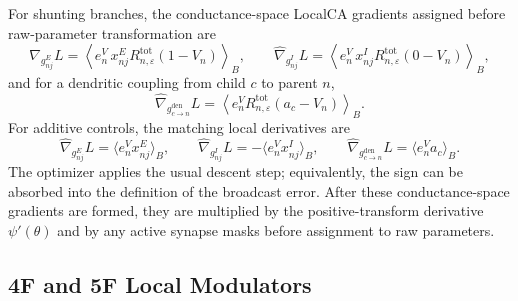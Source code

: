     For shunting branches, the conductance-space LocalCA gradients assigned before raw-parameter transformation are
    \[
    \widehat{\nabla}_{g_{nj}^{E}} L
    =\left\langle e_n^V\, x_{nj}^{E} R_{n,\varepsilon}^{\mathrm{tot}}(1-V_n)\right\rangle_B,
    \qquad
    \widehat{\nabla}_{g_{nj}^{I}} L
    =\left\langle e_n^V\, x_{nj}^{I} R_{n,\varepsilon}^{\mathrm{tot}}(0-V_n)\right\rangle_B,
    \]
    and for a dendritic coupling from child $c$ to parent $n$,
    \[
    \widehat{\nabla}_{g_{c\to n}^{\mathrm{den}}} L
    =\left\langle e_n^V R_{n,\varepsilon}^{\mathrm{tot}}(a_c-V_n)\right\rangle_B.
    \]
    For additive controls, the matching local derivatives are
    \[
    \widehat{\nabla}_{g_{nj}^{E}} L
    =\langle e_n^V x_{nj}^{E}\rangle_B,
    \qquad
    \widehat{\nabla}_{g_{nj}^{I}} L
    =-\langle e_n^V x_{nj}^{I}\rangle_B,
    \qquad
    \widehat{\nabla}_{g_{c\to n}^{\mathrm{den}}} L
    =\langle e_n^V a_c\rangle_B.
    \]
    The optimizer applies the usual descent step; equivalently, the sign can be absorbed into the definition of the broadcast error. After these conductance-space gradients are formed, they are multiplied by the positive-transform derivative $\psi'(\theta)$ and by any active synapse masks before assignment to raw parameters.
    
    \subsection{4F and 5F Local Modulators}
    
